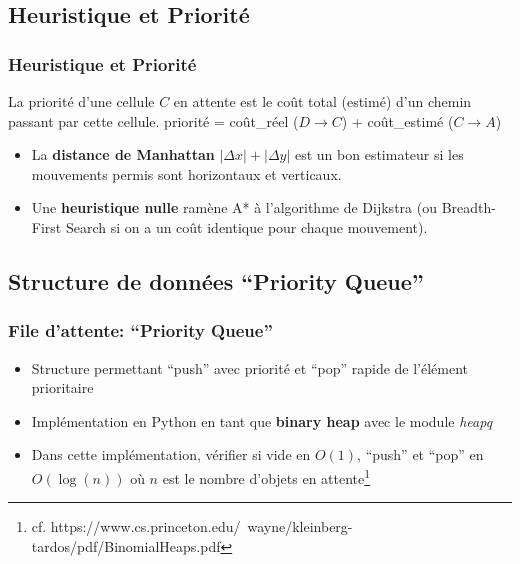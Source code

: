 \documentclass[]{beamer}
\begin{document}
\subsection{Heuristique et Priorité}
\begin{frame}
  \frametitle{Heuristique et Priorité}
  La priorité d'une cellule $C$ en attente est le coût total (estimé) d'un chemin passant par cette cellule.
  \smallskip
  priorité = coût\_réel ($D \rightarrow C$) + coût\_estimé ($C\rightarrow A$)


  \medskip
  \begin{itemize}
  \item<3->{La \textbf{distance de Manhattan} $|\Delta x| + |\Delta y|$ est un bon estimateur 
  si les mouvements permis sont horizontaux et verticaux.}
  \par
  \item<4->{Une \textbf{heuristique nulle} ramène A* à l'algorithme de Dijkstra 
  (ou Breadth-First Search si on a un coût identique pour chaque mouvement).}
  \end{itemize}
\end{frame}

\subsection{Structure de données ``Priority Queue''}
\begin{frame}
  \frametitle{File d'attente: ``Priority Queue''}
  \begin{itemize}
  \item Structure permettant ``push'' avec priorité et ``pop'' rapide de
    l'élément prioritaire
  \item Implémentation en Python en tant que \textbf{binary heap} avec le module \textit{heapq}
  \item Dans cette implémentation, vérifier si vide en $O(1)$, ``push'' et
    ``pop'' en $O\left(\log(n)\right)$ où $n$ est le nombre d'objets en attente\footnote{cf. https://www.cs.princeton.edu/~wayne/kleinberg-tardos/pdf/BinomialHeaps.pdf}
  \end{itemize}
\end{frame}
\end{document}
